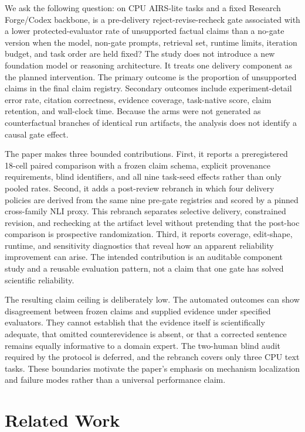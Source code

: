 \documentclass[11pt]{article}
\begin{document}
We ask the following question: on CPU AIRS-lite tasks and a fixed Research Forge/Codex backbone, is a pre-delivery reject-revise-recheck gate associated with a lower protected-evaluator rate of unsupported factual claims than a no-gate version when the model, non-gate prompts, retrieval set, runtime limits, iteration budget, and task order are held fixed? The study does not introduce a new foundation model or reasoning architecture. It treats one delivery component as the planned intervention. The primary outcome is the proportion of unsupported claims in the final claim registry. Secondary outcomes include experiment-detail error rate, citation correctness, evidence coverage, task-native score, claim retention, and wall-clock time. Because the arms were not generated as counterfactual branches of identical run artifacts, the analysis does not identify a causal gate effect.

The paper makes three bounded contributions. First, it reports a preregistered 18-cell paired comparison with a frozen claim schema, explicit provenance requirements, blind identifiers, and all nine task-seed effects rather than only pooled rates. Second, it adds a post-review rebranch in which four delivery policies are derived from the same nine pre-gate registries and scored by a pinned cross-family NLI proxy. This rebranch separates selective delivery, constrained revision, and rechecking at the artifact level without pretending that the post-hoc comparison is prospective randomization. Third, it reports coverage, edit-shape, runtime, and sensitivity diagnostics that reveal how an apparent reliability improvement can arise. The intended contribution is an auditable component study and a reusable evaluation pattern, not a claim that one gate has solved scientific reliability.

The resulting claim ceiling is deliberately low. The automated outcomes can show disagreement between frozen claims and supplied evidence under specified evaluators. They cannot establish that the evidence itself is scientifically adequate, that omitted counterevidence is absent, or that a corrected sentence remains equally informative to a domain expert. The two-human blind audit required by the protocol is deferred, and the rebranch covers only three CPU text tasks. These boundaries motivate the paper's emphasis on mechanism localization and failure modes rather than a universal performance claim.

\section{Related Work}
\end{document}
